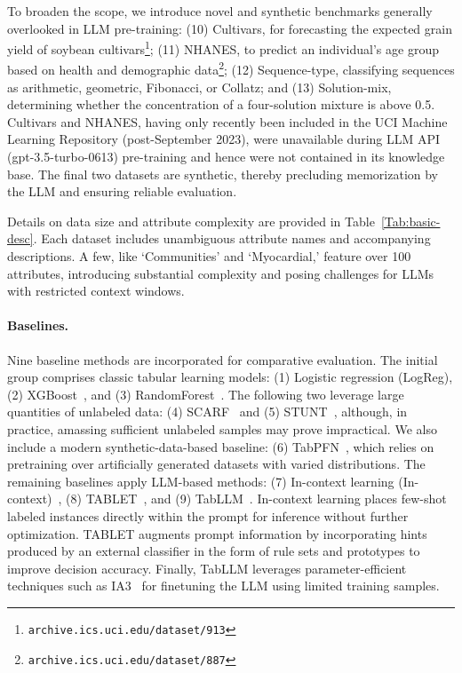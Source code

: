 To broaden the scope, we introduce novel and synthetic benchmarks generally overlooked in LLM pre-training: (10) Cultivars, for forecasting the expected grain yield of soybean cultivars\footnote{\texttt{archive.ics.uci.edu/dataset/913}}; (11) NHANES, to predict an individual's age group based on health and demographic data\footnote{\texttt{archive.ics.uci.edu/dataset/887}}; (12) Sequence-type, classifying sequences as arithmetic, geometric, Fibonacci, or Collatz; and (13) Solution-mix, determining whether the concentration of a four-solution mixture is above 0.5. Cultivars and NHANES, having only recently been included in the UCI Machine Learning Repository (post-September 2023), were unavailable during LLM API (gpt-3.5-turbo-0613) pre-training and hence were not contained in its knowledge base. The final two datasets are synthetic, thereby precluding memorization by the LLM and ensuring reliable evaluation.

Details on data size and attribute complexity are provided in Table~\ref{Tab:basic-desc}.
Each dataset includes unambiguous attribute names and accompanying descriptions. A few, like `Communities' and `Myocardial,' feature over 100 attributes, introducing substantial complexity and posing challenges for LLMs with restricted context windows. 

\vspace*{-0.12in}
\paragraph{Baselines.}
Nine baseline methods are incorporated for comparative evaluation. The initial group comprises classic tabular learning models: (1) Logistic regression (LogReg), (2) XGBoost~\cite{chen2016xgboost}, and (3) RandomForest~\cite{ho1995random}. The following two leverage large quantities of unlabeled data: (4) SCARF~\cite{bahri2022scarf} and (5) STUNT~\cite{nam2023stunt}, although, in practice, amassing sufficient unlabeled samples may prove impractical. We also include a modern synthetic-data-based baseline: (6) TabPFN~\cite{hollmann2022tabpfn}, which relies on pretraining over artificially generated datasets with varied distributions. The remaining baselines apply LLM-based methods: (7) In-context learning (In-context)~\cite{wei2022emergent}, (8) TABLET~\cite{slack2023tablet}, and (9) TabLLM~\cite{hegselmann2023tabllm}. In-context learning places few-shot labeled instances directly within the prompt for inference without further optimization. TABLET augments prompt information by incorporating hints produced by an external classifier in the form of rule sets and prototypes to improve decision accuracy. Finally, TabLLM leverages parameter-efficient techniques such as IA3~\cite{liu2022few} for finetuning the LLM using limited training samples.

